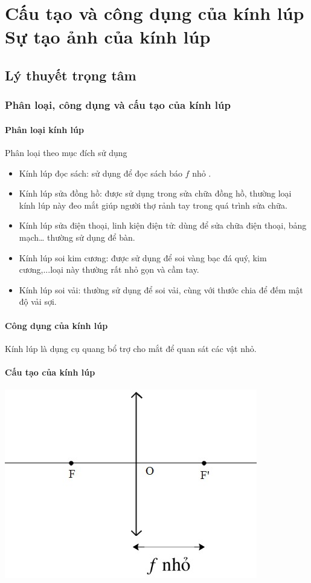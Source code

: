 \chapter[Cấu tạo và công dụng của kính lúp - Sự tạo ảnh của kính lúp]{Cấu tạo và công dụng của kính lúp \\ Sự tạo ảnh của kính lúp}
\section{Lý thuyết trọng tâm}
\subsection{Phân loại, công dụng và cấu tạo của kính lúp}
\subsubsection{Phân loại kính lúp}
Phân loại theo mục đích sử dụng
\begin{itemize}
	\item Kính lúp đọc sách: sử dụng để đọc sách báo $f$ nhỏ   . 
	\item Kính lúp sửa đồng hồ: được sử dụng trong sửa chữa đồng hồ, thường loại kính lúp này đeo mắt giúp người thợ rảnh tay trong quá trình sửa chữa. 
	\item Kính lúp sửa điện thoại, linh kiện điện tử: dùng để sửa chữa điện thoại, bảng mạch… thường sử dụng để bàn.
	\item Kính lúp soi kim cương: được sử dụng để soi vàng bạc đá quý, kim cương,...loại này thường rất nhỏ gọn và cầm tay. 
	\item Kính lúp soi vải: thường sử dụng để soi vải, cùng với thước chia để đếm mật độ vải sợi. 
\end{itemize}	

\subsubsection{Công dụng của kính lúp}

Kính lúp là dụng cụ quang bổ trợ cho mắt để quan sát các vật nhỏ.
\subsubsection{Cấu tạo của kính lúp}
\begin{center}
	\includegraphics[scale=0.5]{../figs/VN11-PH-41-L-029-1-h42.jpg}
\end{center}

